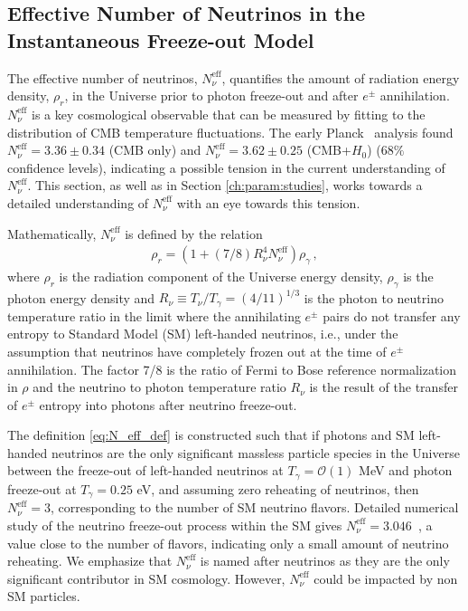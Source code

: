 \subsection{Effective Number of Neutrinos  in the Instantaneous  Freeze-out Model}\label{sec:model:ind}

The effective number of neutrinos, $N^{\text{eff}}_\nu$, quantifies the amount of radiation energy density, $\rho_r$, in the Universe prior to photon freeze-out and after $e^\pm$ annihilation.  $N^{\text{eff}}_\nu$ is a key cosmological observable that can be  measured by fitting to the distribution of CMB temperature fluctuations. The early  Planck~\cite{Planck:2013pxb}  analysis found $N^{\text{eff}}_{\nu}=3.36\pm 0.34$ (CMB only) and $N^{\text{eff}}_{\nu}=3.62\pm 0.25$ (CMB+$H_0$) ($68\%$ confidence levels), indicating a possible tension in the current understanding of $N^{\text{eff}}_\nu$.   This section, as well as in Section \ref{ch:param:studies}, works towards a detailed understanding of $N^{\text{eff}}_{\nu}$ with an eye towards this tension.

Mathematically, $N^{\text{eff}}_\nu$ is defined by the relation
\begin{align}\label{eq:N_eff_def}
\rho_r=\left(1+(7/8)R_\nu^{4}N^{\text{eff}}_\nu\right)\rho_\gamma\,,
\end{align}
where $\rho_r$ is the radiation component of the Universe  energy density, $\rho_\gamma$ is the photon energy density and  $R_\nu\equiv T_\nu/T_\gamma=({4}/{11})^{1/3}$ is the photon to neutrino temperature ratio in the limit where  the annihilating $e^\pm$ pairs do not transfer any entropy  to  Standard Model (SM) left-handed neutrinos, i.e., under the assumption that neutrinos have completely frozen out at the time of $e^\pm$ annihilation.  The factor 7/8 is the ratio of Fermi to Bose reference normalization in $\rho$ and the neutrino to photon temperature ratio $R_\nu$ is the result of the transfer of $e^\pm$ entropy into photons after  neutrino freeze-out.  

The definition \ref{eq:N_eff_def} is constructed such that if photons and SM left-handed neutrinos are the only significant massless particle species in the Universe between the freeze-out of left-handed neutrinos at  $T_\gamma=\mathcal{O}(1)$ MeV and photon freeze-out at $T_\gamma=0.25$ eV, and assuming zero reheating of neutrinos, then $N^{\text{eff}}_{\nu}=3$, corresponding to the number of SM neutrino flavors.  Detailed numerical study of the neutrino freeze-out process within the SM gives $N^{\text{eff}}_{\nu}=3.046$~\cite{Mangano:2005cc}, a value close to the number of flavors, indicating only a small amount of neutrino reheating.  
 We emphasize that $N^{\text{eff}}_\nu$ is named after neutrinos as they are the only significant contributor in SM cosmology. However,   $N^{\text{eff}}_\nu$ could be impacted by non SM particles.

